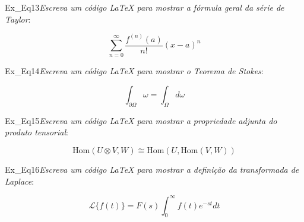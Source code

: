 \begin{texercise}{Ex_Eq13}\textit{Escreva um código \LaTeX{} para mostrar a fórmula geral da série de Taylor}:\par\smallskip%
\begin{tcboutputlisting}
    \begin{center}
        \begin{equation*}
            \sum_{n=0}^{\infty} \frac{f^{(n)}(a)}{n!}(x-a)^n
        \end{equation*}
    \end{center}
\end{tcboutputlisting}
\tcbuselistingtext%
\end{texercise}

\begin{texercise}{Ex_Eq14}\textit{Escreva um código \LaTeX{} para mostrar o Teorema de Stokes}:\par\smallskip%
\begin{tcboutputlisting}
    \begin{center}
        \begin{equation*}
            \int_{\partial{\Omega}} \omega = \int_{\Omega} d\omega
        \end{equation*}
    \end{center}
\end{tcboutputlisting}
\tcbuselistingtext%
\end{texercise}

\begin{texercise}{Ex_Eq15}\textit{Escreva um código \LaTeX{} para mostrar a propriedade adjunta do produto tensorial}:\par\smallskip%
\begin{tcboutputlisting}
    \begin{center}
        \begin{equation*}
            \text{Hom}(U \otimes V, W) \cong \text{Hom}(U, \text{Hom}(V,W))
        \end{equation*}
    \end{center}
\end{tcboutputlisting}
\tcbuselistingtext%
\end{texercise}
  
\begin{texercise}{Ex_Eq16}\textit{Escreva um código \LaTeX{} para mostrar a definição da transformada de Laplace}:\par\smallskip%
\begin{tcboutputlisting}
    \begin{center}
        \begin{equation*}
            \mathcal{L} \lbrace f(t) \rbrace = F(s) \int_{0}^{\infty} f(t) e^{-st} dt
        \end{equation*}
    \end{center}
\end{tcboutputlisting}
\tcbuselistingtext%
\end{texercise}
  
